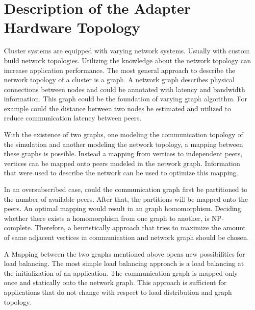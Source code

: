   
\section*{Description of the Adapter Hardware Topology}

Cluster systems are equipped with varying network systems. Usually
with custom build network topologies.  Utilizing the knowledge about
the network topology can increase application performance.  The most
general approach to describe the network topology of a cluster is a
graph. A network graph describes physical connections between nodes
and could be annotated with latency and bandwidth information.  This
graph could be the foundation of varying graph algorithm. For
example could the distance between two nodes be estimated and
utilized to reduce communication latency between peers.

With the existence of two graphs, one modeling the communication
topology of the simulation and another modeling the network
topology, a mapping between these graphs is possible.  Instead a
mapping from vertices to independent peers, vertices can be mapped
onto peers modeled in the network graph. Information that were used
to describe the network can be used to optimize this mapping.

In an oversubscribed case, could the communication graph first be
partitioned to the number of available peers. After that, the
partitions will be mapped onto the peers.  An optimal mapping would
result in an graph homomorphism. Deciding whether there exists a
homomorphism from one graph to another, is NP-complete. Therefore, a
heuristically approach that tries to maximize the amount of same
adjacent vertices in communication and network graph should be
chosen.

A Mapping between the two graphs mentioned above opens new
possibilities for load balancing.  The most simple load balancing
approach is a load balancing at the initialization of an
application. The communication graph is mapped only once and
statically onto the network graph. This approach is sufficient for
applications that do not change with respect to load distribution
and graph topology.

